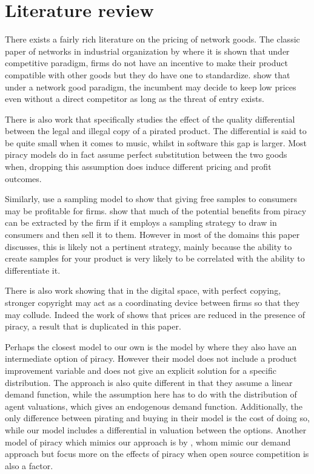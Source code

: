 \documentclass[12pt]{report}
\numberwithin{equation}{section}
\begin{document}
\section{Literature review}

There exists a fairly rich literature on the pricing of network goods. The classic paper of networks in industrial organization by \cite{KS86} where it is shown that under  competitive paradigm, firms do not have an incentive to make their product compatible with other goods but they do have one to standardize. \cite{FT00} show that under a network good paradigm, the incumbent may decide to keep low prices even without a direct competitor as long as the threat of entry exists.

There is also work that specifically studies the effect of the quality differential between the legal and illegal copy of a pirated product\citep{GL03}. The differential is said to be quite small when it comes to music, whilst in software this gap is larger. Most piracy models do in fact assume perfect substitution between the two goods when, dropping this assumption does induce different pricing and profit outcomes.

Similarly, \cite{PW06b} use a sampling model to show that giving free samples to consumers may be profitable for firms. \cite{C05} show that much of the potential benefits from piracy can be extracted by the firm if it employs a sampling strategy to draw in consumers and then sell it to them. However in most of the domains this paper discusses, this is likely not a pertinent strategy, mainly because the ability to create samples for your product is very likely to be correlated with the ability to differentiate it.

There is also work showing that in the digital space, with perfect copying, stronger copyright may act as a coordinating device between firms so that they may collude\citep{J08}. Indeed the work of \cite{S04} shows that prices are reduced in the presence of piracy, a result that is duplicated in this paper.

Perhaps the closest model to our own is the model by \cite{CRP91} where they also have an intermediate option of piracy. However their model does not include a product improvement variable and does not give an explicit solution for a specific distribution. The approach is also quite different in that they assume a linear demand function, while the assumption here has to do with the distribution of agent valuations, which gives an endogenous demand function.  Additionally, the only difference between pirating and buying in their model is the cost of doing so, while our model includes a differential in valuation between the options. Another model of piracy which mimics our approach is by \cite{MRSS17}, whom mimic our demand approach but focus more on the effects of piracy when open source competition is also a factor.
\end{document}

